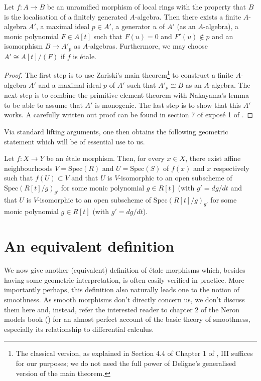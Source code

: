 \begin{theorem}
\label{theorem-structure-etale}
Let $f:A \to B$ be an unramified morphism of local rings with the property
that $B$ is the localisation of a finitely generated $A$-algebra. Then there
exists a finite $A$-algebra $A'$, a maximal ideal $p \in A'$, a generator
$u$ of $A'$ (as an $A$-algebra), a monic polynomial $F \in A[t]$ such that
$F(u) = 0$ and $F'(u) \notin p$ and an isomorphism $B \to A'_p$ as
$A$-algebras. Furthermore, we may choose $A' \cong A[t]/(F)$ if $f$
is \'etale.
\end{theorem}

\begin{proof}
The first step is to use Zariski's main
theorem\footnote{The classical version, as explained in Section 4.4 of
Chapter 1 of \cite{EGA}, III suffices for our purposes; we do not need the
full power of Deligne's generalised version of the main theorem.} to
construct a finite $A$-algebra $A'$ and a maximal ideal $p$ of $A'$ such
that $A'_p \cong B$ as an $A$-algebra. The next step is to combine the
primitive element theorem with Nakayama's lemma to be able to assume that
$A'$ is monogenic. The last step is to show that this $A'$ works. A
carefully written out proof can be found in section 7 of expos\'e 1 of
\cite{SGA1}.
\end{proof}

\noindent
Via standard lifting arguments, one then obtains the following geometric
statement which will be of essential use to us.

\begin{theorem}
\label{theorem-geometric-structure}
Let $f:X \to Y$ be an \'etale morphism. Then, for every $x \in X$, there
exist affine neighbourhoods $V = \text{Spec}(R)$ and $U = \text{Spec}(S)$ of 
$f(x)$
and $x$ respectively such that $f(U) \subset V$ and that $U$ is $V$-isomorphic
to an open subscheme of $\text{Spec}(R[t]/g)_{g'}$ for some monic polynomial
$g \in R[t]$  (with $g' = dg/dt$ and that $U$ is $V$-isomorphic to an open
subscheme of $\text{Spec}(R[t]/g)_{g'}$ for some monic polynomial $g \in R[t]$
(with $g' = dg/dt$).
\end{theorem}

\section{An equivalent definition}
\label{section-definition-equivalent}

\noindent
We now give another (equivalent) definition of \'etale morphisms which,
besides having some geometric interpretation, is often easily verified in
practice. More importantly perhaps, this definition also naturally leads
one to the notion of smoothness. As smooth morphisms don't directly concern
us, we don't discuss them here and, instead, refer the interested reader to
chapter 2 of the Neron models book (\cite{Ner}) for an almost perfect
account of the basic theory of smoothness, especially its relationship to
differential calculus.

